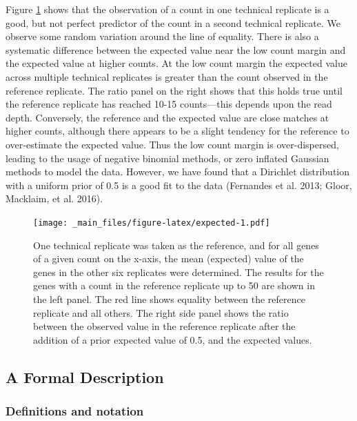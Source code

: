 \documentclass[onecolumn]{article}
\begin{document}
Figure \ref{fig:expected} shows that the observation of a count in one technical replicate is a good, but not perfect predictor of the count in a second technical replicate. We observe some random variation around the line of equality. There is also a systematic difference between the expected value near the low count margin and the expected value at higher counts. At the low count margin the expected value across multiple technical replicates is greater than the count observed in the reference replicate. The ratio panel on the right shows that this holds true until the reference replicate has reached 10-15 counts---this depends upon the read depth. Conversely, the reference and the expected value are close matches at higher counts, although there appears to be a slight tendency for the reference to over-estimate the expected value. Thus the low count margin is over-dispersed, leading to the usage of negative binomial methods, or zero inflated Gaussian methods to model the data. However, we have found that a Dirichlet distribution with a uniform prior of 0.5 is a good fit to the data (Fernandes et al. 2013; Gloor, Macklaim, et al. 2016).

\begin{figure}
\centering
\texttt{[image: \_main\_files/figure-latex/expected-1.pdf]}
\caption{\label{fig:expected}One technical replicate was taken as the reference, and for all genes of a given count on the x-axis, the mean (expected) value of the genes in the other six replicates were determined. The results for the genes with a count in the reference replicate up to 50 are shown in the left panel. The red line shows equality between the reference replicate and all others. The right side panel shows the ratio between the observed value in the reference replicate after the addition of a prior expected value of 0.5, and the expected values.}
\end{figure}

\hypertarget{a-formal-description}{%
\subsection{A Formal Description}\label{a-formal-description}}

\hypertarget{definitions-and-notation}{%
\subsubsection{Definitions and notation}\label{definitions-and-notation}}
\end{document}

